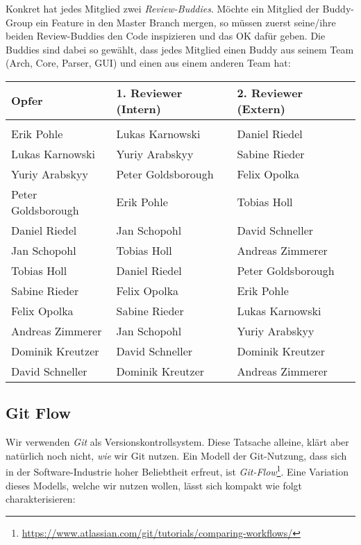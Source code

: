 Konkret hat jedes Mitglied zwei \emph{Review-Buddies}. Möchte ein Mitglied der
Buddy-Group ein Feature in den Master Branch mergen, so müssen zuerst seine/ihre
beiden Review-Buddies den Code inspizieren und das OK dafür geben. Die Buddies
sind dabei so gewählt, dass jedes Mitglied einen Buddy aus seinem Team (Arch,
Core, Parser, GUI) und einen aus einem anderen Team hat:

\begin{table}[h!]
  \centering
  \begin{tabular}{lll}
    \textbf{Opfer} & \textbf{1. Reviewer (Intern)} & \textbf{2. Reviewer (Extern)} \\
    \toprule \\
    Erik Pohle & Lukas Karnowski & Daniel Riedel \\
    Lukas Karnowski & Yuriy Arabskyy &  Sabine Rieder \\
    Yuriy Arabskyy & Peter Goldsborough & Felix Opolka \\
    Peter Goldsborough & Erik Pohle & Tobias Holl \\

    Daniel Riedel & Jan Schopohl & David Schneller \\
    Jan Schopohl & Tobias Holl & Andreas Zimmerer \\
    Tobias Holl & Daniel Riedel & Peter Goldsborough \\

    Sabine Rieder & Felix Opolka & Erik Pohle \\
    Felix Opolka & Sabine Rieder & Lukas Karnowski \\
    Andreas Zimmerer & Jan Schopohl & Yuriy Arabskyy \\

    Dominik Kreutzer & David Schneller & Dominik Kreutzer \\
    David Schneller & Dominik Kreutzer &  Andreas Zimmerer \\
    \bottomrule
  \end{tabular}
\end{table}

\subsection{Git Flow}

Wir verwenden \emph{Git} als Versionskontrollsystem. Diese Tatsache alleine,
klärt aber natürlich noch nicht, \emph{wie} wir Git nutzen. Ein Modell der
Git-Nutzung, dass sich in der Software-Industrie hoher Beliebtheit erfreut, ist
\emph{Git-Flow}\footnote{\url{https://www.atlassian.com/git/tutorials/comparing-workflows/}}. Eine
Variation dieses Modells, welche wir nutzen wollen, lässt sich kompakt wie folgt
charakterisieren:

